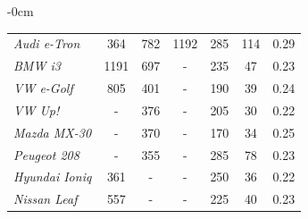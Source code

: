 \documentclass[journal,article,submit,pdftex,moreauthors]{Definitions/mdpi}
\begin{document}
\begin{table}[H]
\begin{adjustwidth}{-\extralength}{0cm}
{\begin{tabular}{@{}lcccccc@{}}
\textit{Audi e-Tron}             & 364        & 782        & 1192       & 285                     & 114                                                                                                   & 0.29                                                                                            \\
\textit{BMW i3}                  & 1191       & 697        & -          & 235                     & 47                                                                                                    & 0.23                                                                                            \\
\textit{VW e-Golf}               & 805        & 401        & -          & 190                     & 39                                                                                                    & 0.24                                                                                            \\
\textit{VW Up!}                  & -          & 376        & -          & 205                     & 30                                                                                                    & 0.22                                                                                            \\
\textit{Mazda MX-30}             & -          & 370        & -          & 170                     & 34                                                                                                    & 0.25                                                                                            \\
\textit{Peugeot 208}             & -          & 355        & -          & 285                     & 78                                                                                                    & 0.23                                                                                            \\
\textit{Hyundai Ioniq}           & 361        & -          & -          & 250                     & 36                                                                                                    & 0.22                                                                                            \\
\textit{Nissan Leaf}             & 557        & -          & -          & 225                     & 40                                                                                                    & 0.23                                                                                            \\

\end{tabular}}
\end{adjustwidth}
\end{table}
\end{document}
